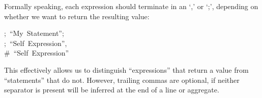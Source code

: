 \documentclass[preprint]{{acmart}}
\begin{document}
\begin{table}[tbp]
\begin{mdcenter}
\mdhr{}%

\noindent{}%
\end{mdcenter}\label{sec-table-terminals}%
\end{table}%

Formally speaking, each expression should terminate in an \textquoteleft{},\textquoteright{} or \textquoteleft{};\textquoteright{}, depending
on whether we want to return the resulting value:%
\begin{mdpre}%
\noindent;~“{My}~{Statement}”;~\\
;~“{Self}~{Expression}”,~\\
{\#~“Self~Expression”~}%
\end{mdpre}\noindent{}This effectively allows us to distinguish \textquotedblleft{}expressions\textquotedblright{} that return a
value from \textquotedblleft{}statements\textquotedblright{} that do not. However, trailing commas are
optional, if neither separator is present will be inferred at the end of
a line or aggregate.
\end{document}
